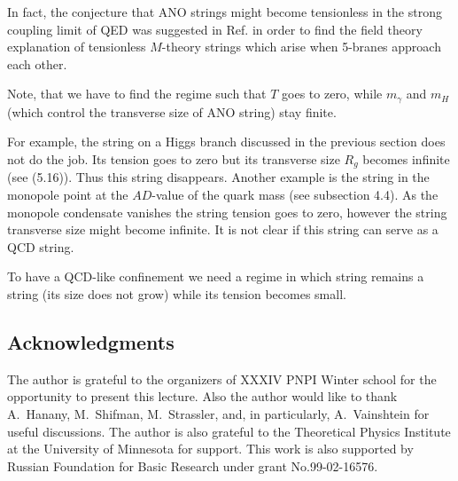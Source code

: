 \documentclass[a4paper,12pt]{article}
\begin{document}
In fact, the conjecture that ANO strings might become
tensionless in the strong coupling limit of QED was suggested in
Ref.\cite{HK} in order to find the field theory explanation of
tensionless $M$-theory strings which arise when 5-branes
approach each other.

Note, that we have to find the regime such that $T$ goes to
zero, while $m_\gamma$ and $m_H$ (which control the transverse
size of ANO string) stay finite.

For example, the string on a Higgs branch discussed in the
previous section does not do the job. Its tension goes to zero
but its transverse size $R_g$ becomes infinite (see (5.16)).
Thus this string disappears. Another example is the string in the
monopole point at the $AD$-value of the quark mass (see
subsection 4.4). As the monopole condensate vanishes the string
tension goes to zero, however the string transverse size
might  become
infinite. It is not clear if this string  can serve as a QCD string.

To have a QCD-like confinement we need a  regime in
which string remains a string (its size does not grow) while its
tension becomes small.


\subsection*{Acknowledgments}

The author is grateful to the organizers of XXXIV PNPI Winter school for
the opportunity to present this lecture. Also the author  would like to
thank A.~Hanany, M.~Shifman, M.~Strassler, and, in particularly,
A.~Vainshtein for useful discussions.
The author is also grateful to the Theoretical Physics Institute at the 
University of Minnesota for support.
 This work is also supported by
Russian Foundation for Basic Research under grant
No.99-02-16576.
\end{document}
